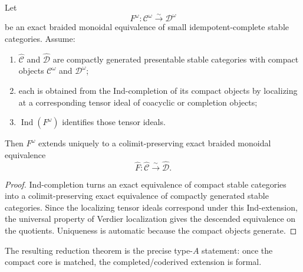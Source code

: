 \begin{theorem}
\ClaimStatusProvedHere
\label{thm:compact-to-completed-extension-principle}
Let
\begin{equation}
F^\omega:\mathcal C^\omega\xrightarrow{\sim}\mathcal D^\omega
\end{equation}
be an exact braided monoidal equivalence of small idempotent-complete
stable categories. Assume:
\begin{enumerate}
 \item $\widehat{\mathcal C}$ and $\widehat{\mathcal D}$ are compactly
 generated presentable stable categories with compact objects
 $\mathcal C^\omega$ and $\mathcal D^\omega$;
 \item each is obtained from the Ind-completion of its compact objects
 by localizing at a corresponding tensor ideal of coacyclic or
 completion objects;
 \item $\operatorname{Ind}(F^\omega)$ identifies those tensor ideals.
\end{enumerate}
Then $F^\omega$ extends uniquely to a colimit-preserving exact braided
monoidal equivalence
\begin{equation}
\widehat F:\widehat{\mathcal C}\xrightarrow{\sim}\widehat{\mathcal D}.
\end{equation}
\end{theorem}

\begin{proof}
Ind-completion turns an exact equivalence of compact stable categories
into a colimit-preserving exact equivalence of compactly generated stable
categories. Since the localizing tensor ideals correspond under this
Ind-extension, the universal property of Verdier localization gives the
descended equivalence on the quotients. Uniqueness is automatic because
the compact objects generate.
\end{proof}

The resulting reduction theorem is the precise type-$A$ statement: once
the compact core is matched, the completed/coderived extension is formal.

